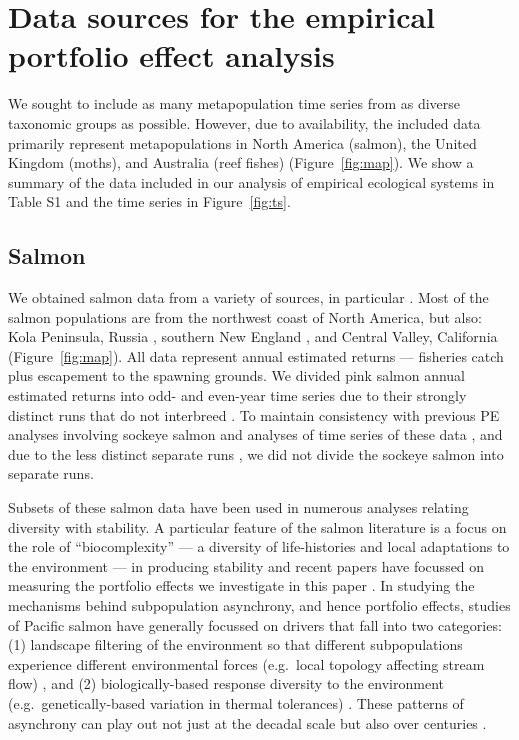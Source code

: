 \section{Data sources for the empirical portfolio effect analysis}
We sought to include as many metapopulation time series from as diverse
taxonomic groups as possible. However, due to availability, the included data
primarily represent metapopulations in North America (salmon), the United
Kingdom (moths), and Australia (reef fishes) (Figure~\ref{fig:map}). We show a
summary of the data included in our analysis of empirical ecological systems
in Table S1 and the time series in Figure~\ref{fig:ts}.

\subsection{Salmon}
We obtained salmon data from a variety of sources, in particular
\citet{dorner2008}. Most of the salmon populations are from the northwest
coast of North America, but also: Kola Peninsula, Russia
\citep{jensen1999}, southern New England \citep{kocik2006}, and
Central Valley, California \citep{carlson2011} (Figure~\ref{fig:map}). All
data represent annual estimated returns --- fisheries catch plus escapement to
the spawning grounds. We divided pink salmon annual estimated returns into odd-
and even-year time series due to their strongly distinct runs that do not
interbreed \citep{quinn2005}. To maintain consistency with previous PE
analyses involving sockeye salmon \citep{schindler2010} and analyses of
time series of these data \citep{dorner2008}, and due to the less distinct
separate runs \citep{quinn2005}, we did not divide the sockeye salmon into
separate runs.

Subsets of these salmon data have been used in numerous analyses relating
diversity with stability. A particular feature of the salmon literature is a
focus on the role of ``biocomplexity'' --- a diversity of life-histories and
local adaptations to the environment --- in producing stability
\citep{hilborn2003} and recent papers have focussed on measuring the
portfolio effects we investigate in this paper \citep{schindler2010,
  carlson2011}. In studying the mechanisms behind subpopulation
asynchrony, and hence portfolio effects, studies of Pacific salmon have
generally focussed on drivers that fall into two categories: (1) landscape
filtering of the environment so that different subpopulations experience
different environmental forces (e.g.\ local topology affecting stream flow)
\citep[e.g.][]{schindler2008}, and (2) biologically-based response
diversity to the environment (e.g.\ genetically-based variation in thermal
tolerances) \citep[e.g.][]{eliason2011}. These patterns of asynchrony can
play out not just at the decadal scale but also over centuries
\citep{rogers2013}.

